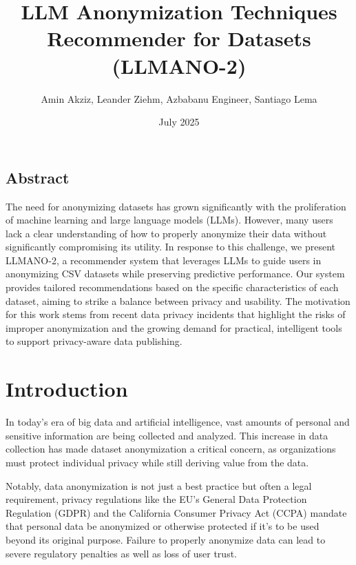 \documentclass{article}
\title{LLM Anonymization Techniques Recommender for Datasets (LLMANO-2)}
\author{Amin Akziz, Leander Ziehm, Azbabanu Engineer, Santiago Lema}
\date{July 2025}
\begin{document}
\maketitle

\begin{center}
\begin{minipage}{0.85\textwidth}
\section*{Abstract}
The need for anonymizing datasets has grown significantly with the proliferation of machine learning and large language models (LLMs). However, many users lack a clear understanding of how to properly anonymize their data without significantly compromising its utility. In response to this challenge, we present LLMANO-2, a recommender system that leverages LLMs to guide users in anonymizing CSV datasets while preserving predictive performance. Our system provides tailored recommendations based on the specific characteristics of each dataset, aiming to strike a balance between privacy and usability. The motivation for this work stems from recent data privacy incidents that highlight the risks of improper anonymization and the growing demand for practical, intelligent tools to support privacy-aware data publishing.
\end{minipage}
\end{center}

\section{Introduction}

In today’s era of big data and artificial intelligence, vast amounts of personal and sensitive information are being collected and analyzed. This increase in data collection has made dataset anonymization a critical concern, as organizations must protect individual privacy while still deriving value from the data.

Notably, data anonymization is not just a best practice but often a legal requirement, privacy regulations like the EU’s General Data Protection Regulation (GDPR) and the California Consumer Privacy Act (CCPA) mandate that personal data be anonymized or otherwise protected if it’s to be used beyond its original purpose. Failure to properly anonymize data can lead to severe regulatory penalties as well as loss of user trust.
\end{document}
